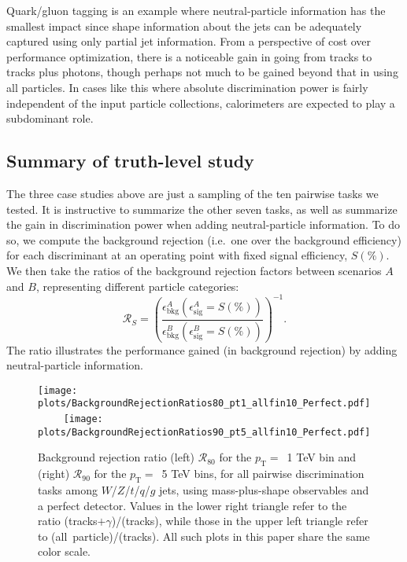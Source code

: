 \documentclass[11pt,letterpaper]{article}
\newcommand{\pt}{p_{\mathrm{T}}}
\begin{document}
Quark/gluon tagging is an example where neutral-particle information has the smallest impact since shape information about the jets can be adequately captured using only partial jet information.
%
From a perspective of cost over performance optimization, there is a noticeable gain in going from tracks to tracks plus photons, though perhaps not much to be gained beyond that in using all particles.
%
In cases like this where absolute discrimination power is fairly independent of the input particle collections, calorimeters are expected to play a subdominant role. 

\subsection{Summary of truth-level study}
\label{sec:ratiospartial}

The three case studies above are just a sampling of the ten pairwise tasks we tested.
%
It is instructive to summarize the other seven tasks, as well as summarize the gain in discrimination power when adding neutral-particle information.
%
To do so, we compute the background rejection (i.e.~one over the background efficiency) for each discriminant at an operating point with fixed signal efficiency, $S(\%)$.
% 
We then take the ratios of the background rejection factors between scenarios $A$ and $B$, representing different particle categories:
%
\begin{equation}
\mathcal{R}_{S} = \left(\frac{\epsilon_\text{bkg}^A( \epsilon_\text{sig}^A = S(\%))}{\epsilon_\text{bkg}^B( \epsilon_\text{sig}^B = S(\%))} \right)^{-1}.
\label{eq:ratio}
\end{equation}
%
The ratio illustrates the performance gained (in background rejection) by adding neutral-particle information.

\begin{figure}[t]
\begin{center}
\texttt{[image: plots/BackgroundRejectionRatios80\_pt1\_allfin10\_Perfect.pdf]}
$\qquad$
\texttt{[image: plots/BackgroundRejectionRatios90\_pt5\_allfin10\_Perfect.pdf]}
\end{center}
\caption{Background rejection ratio (left) $\mathcal{R}_{80}$ for the $\pt =$~1 TeV bin and (right) $\mathcal{R}_{90}$ for the $\pt =$~5 TeV bins, for all pairwise discrimination tasks among $W$/$Z$/$t$/$q$/$g$ jets, using mass-plus-shape observables and a perfect detector.  Values in the lower right triangle refer to the ratio (tracks$+\gamma$)/(tracks), while those in the upper left triangle refer to (all~particle)/(tracks).   All such plots in this paper share the same color scale.}
\label{fig:MAPSPerfect}
\end{figure}
\end{document}
